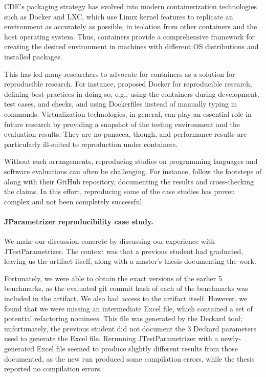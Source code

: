 CDE's packaging strategy has evolved into modern containerization technologies such as Docker and LXC, which use Linux kernel features to replicate an environment as accurately as possible, in isolation from other containers and the host operating system. Thus, containers provide a comprehensive framework for creating the desired environment in machines with different OS distributions and installed packages. 

This has led many researchers to advocate for containers as a solution for reproducible research. For instance,  proposed Docker for reproducible research, defining best practices in doing so, e.g., using the containers during development, test cases, and checks, and using Dockerfiles instead of manually typing in commands. Virtualization technologies, in general, can play an essential role in future research by providing a snapshot of the testing environment and the evaluation results. They are no panacea, though, and performance results are particularly ill-suited to reproduction under containers.

Without such arrangements, reproducing studies on programming languages and software evaluations can often be challenging. For instance,  follow the footsteps of  along with their GitHub repository, documenting the results and cross-checking the claims. In this effort, reproducing some of the case studies has proven complex and not been completely successful.

\paragraph{JParametrizer reproducibility case study.}
We make our discussion concrete by discussing our experience with JTestParametrizer. The context was that a previous student had graduated, leaving us the artifact itself, along with a master's thesis documenting the work. 

Fortunately, we were able to obtain the exact versions of the earlier 5 benchmarks, as the evaluated git commit hash of each of the benchmarks was included in the artifact. We also had access to the artifact itself. However, we found that we were missing an intermediate Excel file, which contained a set of potential refactoring nominees. This file was generated by the Deckard tool; unfortunately, the previous student did not document the 3 Deckard parameters used to generate the Excel file. Rerunning JTestParametrizer with a newly-generated Excel file seemed to produce slightly different results from those documented, as the new run produced some compilation errors, while the thesis reported no compilation errors.

